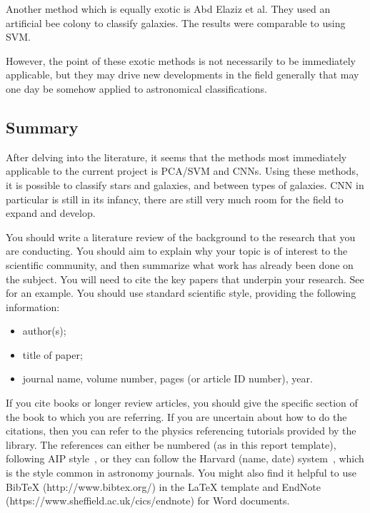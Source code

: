 \documentclass[a4paper,11pt]{article}
\begin{document}
Another method which is equally exotic is Abd Elaziz et al. They used an artificial bee colony to classify galaxies. \cite{abdelaziz_2018_galaxies} The results were comparable to using SVM. 

However, the point of these exotic methods is not necessarily to be immediately applicable, but they may drive new developments in the field generally that may one day be somehow applied to astronomical classifications.

\subsection{Summary}
After delving into the literature, it seems that the methods most immediately applicable to the current project is PCA/SVM and CNNs. Using these methods, it is possible to classify stars and galaxies, and between types of galaxies. CNN in particular is still in its infancy, there are still very much room for the field to expand and develop. 

\newpage
\label{sec:theory}

You should write a literature review of the background to the research that you are conducting. You should aim to explain why your topic is of interest to the scientific community, and then summarize what work has already been done on the subject. You will need to cite the key papers that underpin your research. See \cite{Einstein} for an example. You should use standard scientific style, providing the following information: 
\begin{itemize}
\item author(s);
\item title of paper;
\item journal name, volume number, pages (or article ID number), year.
\end{itemize}
If you cite books \cite{good book} or longer review articles, you should give the specific section of the book to which you are referring. 
If you are uncertain about how to do the citations, then you can refer to the physics referencing tutorials provided by the library.
The references can either be numbered (as in this report template), following AIP style~\cite{AIP style}, or they can follow the Harvard (name, date) system~\cite{Harvard style}, which is the  style common in astronomy journals. 
You might also find it helpful to use BibTeX (http://www.bibtex.org/) in the LaTeX template and EndNote (https://www.sheffield.ac.uk/cics/endnote) for Word documents.
\end{document}
